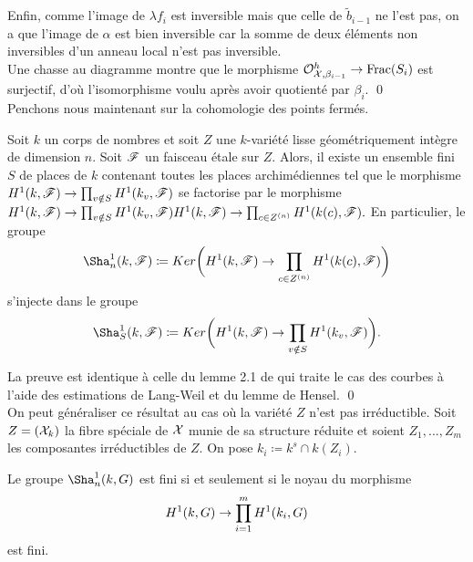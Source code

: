 \documentclass[11pt]{article}
\begin{document}
Enfin, comme l'image de $\lambda f_i$ est inversible mais que celle de $\tilde{b}_{i-1}$ ne l'est pas, on a que l'image de $\alpha$ est bien inversible car la somme de deux éléments non inversibles d'un anneau local n'est pas inversible.\\

Une chasse au diagramme montre que le morphisme $\mathcal{O}_{\mathcal{X},\beta_{i-1}}^h \rightarrow \text{Frac}(S_i)$ est surjectif, d'où l'isomorphisme voulu après avoir quotienté par $\beta_{i}$. \qed
\\
Penchons nous maintenant sur la cohomologie des points fermés.

\begin{lemme}\label{lemHarSzagénéral}
    Soit $k$ un corps de nombres et soit $Z$ une $k$-variété lisse géométriquement intègre de dimension $n$. Soit $\mathscr{F}$ un faisceau étale sur $Z$. Alors, il existe un ensemble fini $S$ de places de $k$ contenant toutes les places archimédiennes tel que le morphisme 
$H^1(k,\mathscr{F}) \rightarrow \prod_{v \notin S}H^1(k_v,\mathscr{F})$
se factorise par le morphisme
$H^1(k,\mathscr{F}) \rightarrow \prod_{v \notin S}H^1(k_v,\mathscr{F})H^1(k,\mathscr{F}) \rightarrow \prod_{c \in Z^{(n)}}H^1(k(c),\mathscr{F}).
$
En particulier, le groupe $$\Sha_n^1(k,\sF) \coloneqq Ker\bigg(H^1(k,\sF) \ra \prod_{c \in Z^{(n)}}H^1(k(c),\sF)\bigg)$$ s'injecte dans le groupe $$\Sha_{S}^1(k,\sF) \coloneqq Ker\bigg(H^1(k,\sF) \ra \prod_{v \notin S}H^1(k_v,\sF)\bigg).$$
\end{lemme}

\proof La preuve est identique à celle du lemme 2.1 de \cite{HarSza} qui traite le cas des courbes à l'aide des estimations de Lang-Weil \cite{LangWeil} et du lemme de Hensel.
\qed \\


On peut généraliser ce résultat au cas où la variété $Z$ n'est pas irréductible. Soit $Z = (\mathcal{X}_k)$ la fibre spéciale de $\mathcal{X}$ munie de sa structure réduite et soient $Z_1,...,Z_m$ les composantes irréductibles de $Z$. On pose $k_i \coloneqq k^s \cap k(Z_i)$.
\begin{lemme}\label{lemfinitude}
Le groupe $\Sha_{n}^1(k,G)$ est fini si et seulement si le noyau du morphisme
$$
H^1(k,G) \rightarrow \prod_{i=1}^{m}H^1(k_i,G)
$$
est fini.
\end{lemme}
\end{document}
